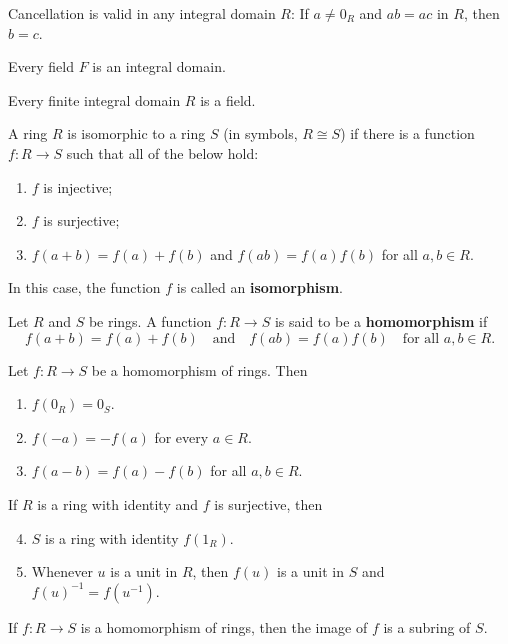 \documentclass[../main.tex]{subfiles}
\begin{document}
\begin{theorem}
Cancellation is valid in any integral domain $R$: If $a \neq 0_R$ and $ab = ac$ in $R$, then $b = c$.
\end{theorem}

\begin{theorem}
Every field $F$ is an integral domain.
\end{theorem}

\begin{theorem}
Every finite integral domain $R$ is a field.
\end{theorem}






\begin{definition}[Isomorphism]
A ring $R$ is isomorphic to a ring $S$ (in symbols, $R \cong S$) if there is a function $f: R \to S$ such that all of the below hold:
\begin{enumerate}
    \item $f$ is injective;
    \item $f$ is surjective;
    \item $f(a + b) = f(a) + f(b)$ \quad and \quad $f(ab) = f(a) f(b)$ for all $a, b \in R$.
\end{enumerate}
In this case, the function $f$ is called an \textbf{isomorphism}.
\end{definition}






\begin{definition}[Homomorphism]
Let $R$ and $S$ be rings. A function $f: R \to S$ is said to be a \textbf{homomorphism} if
\[
f(a + b) = f(a) + f(b) \quad \text{and} \quad f(ab) = f(a) f(b) \quad \text{for all } a, b \in R.
\]
\end{definition}










\begin{theorem}
Let $f: R \to S$ be a homomorphism of rings. Then
\begin{enumerate}
    \item $f(0_R) = 0_S$.
    \item $f(-a) = -f(a)$ for every $a \in R$.
    \item $f(a - b) = f(a) - f(b)$ for all $a, b \in R$.
\end{enumerate}

If $R$ is a ring with identity and $f$ is surjective, then
\begin{enumerate}
    \setcounter{enumi}{3}
    \item $S$ is a ring with identity $f(1_R)$.
    \item Whenever $u$ is a unit in $R$, then $f(u)$ is a unit in $S$ and $f(u)^{-1} = f(u^{-1})$.
\end{enumerate}
\end{theorem}











\begin{corollary}
If $f: R \to S$ is a homomorphism of rings, then the image of $f$ is a subring of $S$.
\end{corollary}
\end{document}
